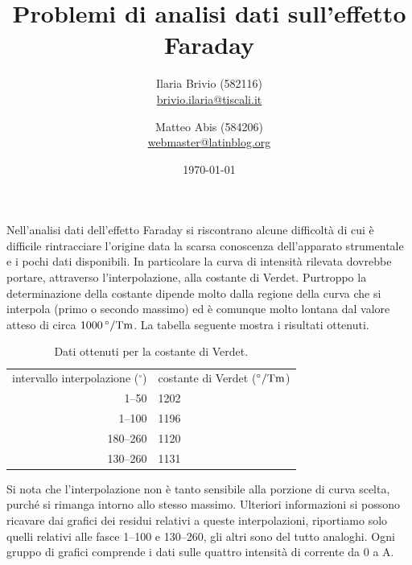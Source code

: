 \documentclass[italian,a4paper]{article}
\begin{document}
\title{Problemi di analisi dati sull'effetto Faraday}
\author{\normalsize Ilaria Brivio (582116)\\%
\normalsize \url{brivio.ilaria@tiscali.it}%
\and %
\normalsize Matteo Abis (584206)\\ %
\normalsize \url{webmaster@latinblog.org}}
\date{\today}
\maketitle
Nell'analisi dati dell'effetto Faraday si riscontrano alcune difficoltà di
cui è difficile rintracciare l'origine data la scarsa conoscenza
dell'apparato strumentale e i pochi dati disponibili. In particolare la
curva di intensità rilevata dovrebbe portare, attraverso l'interpolazione,
alla costante di Verdet. Purtroppo la determinazione della costante
dipende molto dalla regione della curva che si interpola (primo o secondo
massimo) ed è comunque molto lontana dal valore atteso di circa
$\unit[1000]{^\circ / Tm}$. La tabella seguente mostra i risultati ottenuti.
\begin{table}[h]
    \centering
    \begin{tabular}{rl}
        intervallo interpolazione ($^\circ$) & costante di Verdet
        ($\unit[]{^\circ /Tm}$)\\
        1--50 & 1202\\
        1--100 & 1196\\
        180--260 & 1120\\
        130--260 & 1131\\
    \end{tabular}
    \caption{Dati ottenuti per la costante di Verdet.}
    \label{tab:verdet}
\end{table}
Si nota che l'interpolazione non è tanto sensibile
alla porzione di curva scelta, purch\'e si rimanga intorno allo stesso
massimo.
Ulteriori informazioni si possono ricavare dai grafici dei residui relativi
a queste interpolazioni, riportiamo solo quelli relativi alle fasce 1--100 e
130--260, gli altri sono del tutto analoghi. Ogni gruppo di grafici
comprende i dati sulle quattro intensità di corrente da 0 a
\unit[3]{A}.
\end{document}
